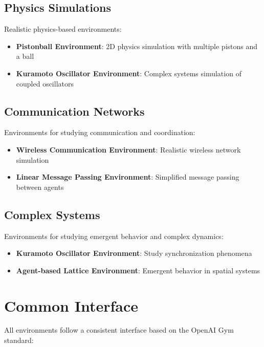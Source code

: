\subsection{Physics Simulations}

Realistic physics-based environments:

\begin{itemize}
    \item \textbf{Pistonball Environment}: 2D physics simulation with multiple pistons and a ball
    \item \textbf{Kuramoto Oscillator Environment}: Complex systems simulation of coupled oscillators
\end{itemize}

\subsection{Communication Networks}

Environments for studying communication and coordination:

\begin{itemize}
    \item \textbf{Wireless Communication Environment}: Realistic wireless network simulation
    \item \textbf{Linear Message Passing Environment}: Simplified message passing between agents
\end{itemize}

\subsection{Complex Systems}

Environments for studying emergent behavior and complex dynamics:

\begin{itemize}
    \item \textbf{Kuramoto Oscillator Environment}: Study synchronization phenomena
    \item \textbf{Agent-based Lattice Environment}: Emergent behavior in spatial systems
\end{itemize}

\section{Common Interface}

All environments follow a consistent interface based on the OpenAI Gym standard:

